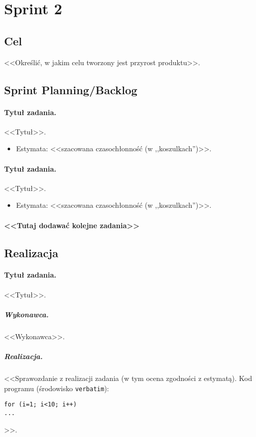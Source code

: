 \documentclass[a4paper]{article}
\begin{document}
\section{Sprint 2}

\subsection{Cel} <<Określić, w jakim celu tworzony jest przyrost produktu>>.

\subsection{Sprint Planning/Backlog}

\paragraph{Tytuł zadania.} <<Tytuł>>.
\begin{itemize}
\item Estymata: <<szacowana czasochłonność (w ,,koszulkach'')>>.
\end{itemize}

\paragraph{Tytuł zadania.} <<Tytuł>>.
\begin{itemize}
\item Estymata: <<szacowana czasochłonność (w ,,koszulkach'')>>.
\end{itemize}

\paragraph{<<Tutaj dodawać kolejne zadania>>}

\subsection{Realizacja}

\paragraph{Tytuł zadania.} <<Tytuł>>.
\subparagraph{Wykonawca.} <<Wykonawca>>.
\subparagraph{Realizacja.} <<Sprawozdanie z realizacji zadania (w tym ocena zgodności z estymatą). Kod programu (środowisko \texttt{verbatim}): \begin{verbatim}
for (i=1; i<10; i++)
...
\end{verbatim}>>.
\end{document}
